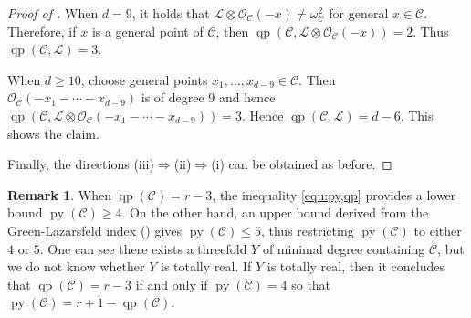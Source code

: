 \documentclass[11pt,letterpaper,reqno]{amsart}
\theoremstyle{plain}
\theoremstyle{definition}
\newtheorem{remark}[theorem]{Remark}
\newtheorem{open problem}[theorem]{Open Problem}
\newtheorem{remark and notation}[theorem]{Remark and Notation}
\newtheorem{remark and definition}[theorem]{Remark and Definition}
\newtheorem{definition and notation}[theorem]{Definition and Notation}
\newtheorem{notation and convention}[theorem]{Notation and Convention}
\newtheorem{notation and remark}[theorem]{Notation and Remark}
\newtheorem{convention and notation}[theorem]{Convention and Notation}
\def \py {\operatorname{py}}
\def \qp {\operatorname{qp}}
\begin{document}
\begin{proof}[Proof of ]
When $d = 9$, it holds that $\mathcal{L} \otimes \mathcal{O}_{\mathcal{C}} (-x) \neq \omega_{\mathcal{C}}^2$ for general $x \in \mathcal{C}$. 
Therefore, if $x$ is a general point of $\mathcal{C}$, then $\qp (\mathcal{C},\mathcal{L} \otimes \mathcal{O}_{\mathcal{C}} (-x) ) = 2$. 
Thus $\qp (\mathcal{C},\mathcal{L}) = 3$.

When $d \geq 10$, choose general points $x_1, \ldots, x_{d-9} \in \mathcal{C}$. 
Then $\mathcal{O}_{\mathcal{C}} (-x_1 - \cdots - x_{d-9})$ is of degree $9$ and hence $\qp (\mathcal{C},\mathcal{L} \otimes \mathcal{O}_{\mathcal{C}} (-x_1 - \cdots - x_{d-9}) ) = 3$. Hence $\qp (\mathcal{C},\mathcal{L}) = d-6$. 
This shows the claim.

Finally, the directions (iii)$\Rightarrow$(ii)$\Rightarrow$(i) can be obtained as before.
\end{proof}

\begin{remark}
    When $\qp(\mathcal{C}) = r - 3$, the inequality \eqref{equ:py,qp} provides a lower bound $\py(\mathcal{C}) \geq 4$. 
    On the other hand, an upper bound derived from the Green-Lazarsfeld index (\cite[Theorem 1.1.\rm {(ii)}]{MR4397034}) gives $\py(\mathcal{C}) \leq 5$, thus restricting $\py(\mathcal{C})$ to either $4$ or $5$.
    One can see there exists a threefold $Y$ of minimal degree containing $\mathcal{C}$, but we do not know whether $Y$ is totally real.
    If $Y$ is totally real, then it concludes that $\qp(\mathcal{C}) = r - 3$ if and only if $\py(\mathcal{C}) = 4$ so that $\py(\mathcal{C})=r+1-\qp(\mathcal{C})$.
\end{remark}



\end{document}
